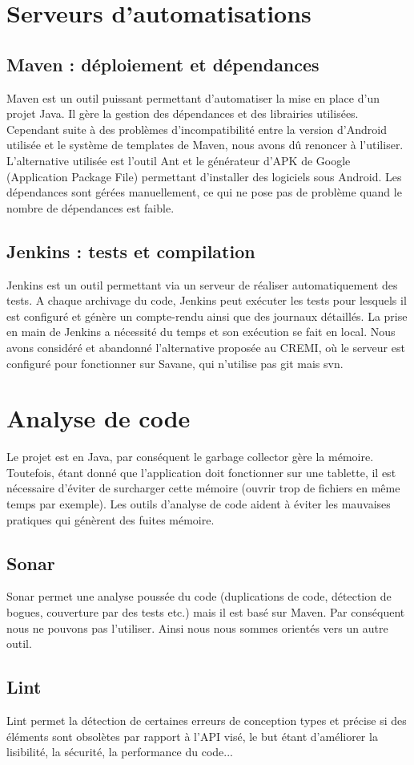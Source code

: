 \section{Serveurs d'automatisations}

\subsection{Maven : déploiement et dépendances}
Maven est un outil puissant permettant d'automatiser la mise en place d'un projet Java. Il gère la gestion des dépendances et des librairies utilisées. Cependant suite à des problèmes d'incompatibilité entre la version d'Android utilisée et le système de templates de Maven, nous avons dû renoncer à l'utiliser.
L'alternative utilisée est l'outil Ant et le générateur d'APK de Google (Application Package File) permettant d'installer des logiciels sous Android. Les dépendances sont gérées manuellement, ce qui ne pose pas de problème quand le nombre de dépendances est faible.

\subsection{Jenkins : tests et compilation}
Jenkins est un outil permettant via un serveur de réaliser automatiquement des tests. A chaque archivage du code, Jenkins peut exécuter les tests pour lesquels il est configuré et génère
un compte-rendu ainsi que des journaux détaillés. La prise en main de Jenkins a nécessité du temps et son exécution
se fait en local. Nous avons considéré et abandonné l'alternative proposée au CREMI, où le serveur est configuré pour fonctionner sur Savane, qui n'utilise pas git mais svn.

\section{Analyse de code}

Le projet est en Java, par conséquent le garbage collector gère la mémoire. Toutefois, étant donné que l'application doit 
fonctionner sur une tablette, il est nécessaire d'éviter de surcharger cette mémoire (ouvrir trop de fichiers en même temps par exemple). Les outils d'analyse de code aident à éviter les mauvaises pratiques qui génèrent des fuites mémoire.
\subsection{Sonar}
Sonar permet une analyse poussée du code (duplications de code, détection de bogues, couverture par des tests etc.) mais il est basé sur Maven. Par conséquent nous ne pouvons pas l'utiliser. Ainsi nous nous sommes orientés vers un autre outil.

\subsection{Lint}
Lint permet la détection de certaines erreurs de conception types et précise si des éléments sont
obsolètes par rapport à l'API visé, le but étant d'améliorer la lisibilité, la sécurité, la performance du code...